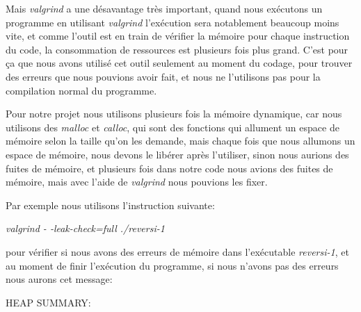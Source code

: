 \documentclass[a4paper,12pt]{article}
\begin{document}
\noindent \begin{justify}
Mais \textit{valgrind} a une désavantage très important, quand nous exécutons un programme en utilisant \textit{valgrind} l’exécution sera notablement beaucoup moins vite, et comme l’outil est en train de vérifier la mémoire pour chaque instruction du code, la consommation de ressources est plusieurs fois plus grand. C’est pour ça que nous avons utilisé cet outil seulement au moment du codage, pour trouver des erreurs que nous pouvions avoir fait, et nous ne l’utilisons pas pour la compilation normal du programme. 
\end{justify}\par



\noindent \begin{justify}
Pour notre projet nous utilisons plusieurs fois la mémoire dynamique, car nous utilisons des \textit{malloc } et \textit{calloc}, qui sont des fonctions qui allument un espace de mémoire selon la taille qu’on les demande, mais chaque fois que nous allumons un espace de mémoire, nous devons le libérer après l’utiliser, sinon nous aurions des fuites de mémoire, et plusieurs fois dans notre code nous avions des fuites de mémoire, mais avec l’aide de \textit{valgrind} nous pouvions les fixer.
\end{justify}\par


\noindent \begin{justify}
Par exemple nous utilisons l’instruction suivante:
\end{justify}\par


\noindent \begin{Center}
\textit{valgrind - -leak-check=full ./reversi-1 }
\end{Center}\par


\noindent \begin{justify}
pour vérifier si nous avons des erreurs de mémoire dans l’exécutable \textit{reversi-1}, et au moment de finir l’exécution du programme, si nous n’avons pas des erreurs nous aurons cet message:
\end{justify}\par


\vspace{\baselineskip}

\noindent \begin{justify}
\hspace*{0.49in}\hspace*{0.49in}HEAP SUMMARY:
\end{justify}\par
\end{document}
